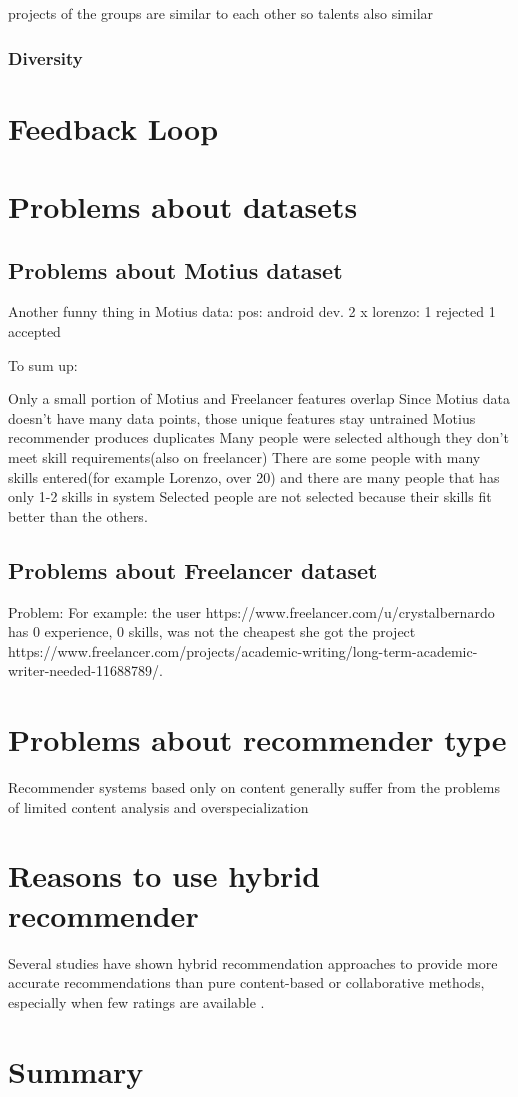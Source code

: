 projects of the groups are similar to each other so talents also similar

\subsubsection{Diversity}

\section{Feedback Loop}

\section{Problems about datasets}

\subsection{Problems about Motius dataset}

Another funny thing in Motius data: pos: android dev. 2 x lorenzo: 1 rejected 1 accepted

To sum up:

Only a small portion of Motius and Freelancer features overlap
Since Motius data doesn't have many data points, those unique features stay untrained
Motius recommender produces duplicates
Many people were selected although they don't meet skill requirements(also on freelancer)
There are some people with many skills entered(for example Lorenzo, over 20) and there are many people that has only 1-2 skills in system
Selected people are not selected because their skills fit better than the others.

\subsection{Problems about Freelancer dataset}

Problem: For example: the user https://www.freelancer.com/u/crystalbernardo has 0 experience, 0 skills, was not the cheapest she got the project https://www.freelancer.com/projects/academic-writing/long-term-academic-writer-needed-11688789/.

\section{Problems about recommender type}
Recommender systems based only on content generally suffer from the problems of limited content analysis and overspecialization \cite{shardanand1995social}

\section{Reasons to use hybrid recommender}
Several studies have shown hybrid recommendation approaches to provide more accurate recommendations than pure content-based or collaborative methods, especially when few ratings are available \cite{adomavicius2005toward}.


\section{Summary}
